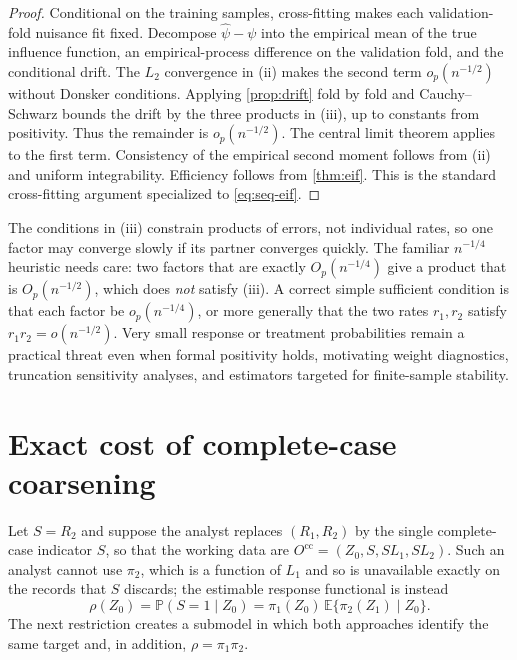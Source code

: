 \documentclass[11pt]{article}
\theoremstyle{definition}
\newcommand{\E}{\mathbb{E}}
\newcommand{\Pp}{\mathbb{P}}
\newcommand{\1}{\mathbf{1}}
\newcommand{\cc}{\mathrm{cc}}
\begin{document}
\begin{proof}
Conditional on the training samples, cross-fitting makes each validation-fold nuisance fit fixed. Decompose $\widehat\psi-\psi$ into the empirical mean of the true influence function, an empirical-process difference on the validation fold, and the conditional drift. The $L_2$ convergence in (ii) makes the second term $o_p(n^{-1/2})$ without Donsker conditions. Applying \cref{prop:drift} fold by fold and Cauchy--Schwarz bounds the drift by the three products in (iii), up to constants from positivity. Thus the remainder is $o_p(n^{-1/2})$. The central limit theorem applies to the first term. Consistency of the empirical second moment follows from (ii) and uniform integrability. Efficiency follows from \cref{thm:eif}. This is the standard cross-fitting argument \citep{chernozhukov2018} specialized to \cref{eq:seq-eif}.
\end{proof}

The conditions in (iii) constrain products of errors, not individual rates, so
one factor may converge slowly if its partner converges quickly. The familiar
$n^{-1/4}$ heuristic needs care: two factors that are exactly $O_p(n^{-1/4})$
give a product that is $O_p(n^{-1/2})$, which does \emph{not} satisfy (iii). A
correct simple sufficient condition is that each factor be $o_p(n^{-1/4})$, or
more generally that the two rates $r_1,r_2$ satisfy $r_1r_2=o(n^{-1/2})$. Very
small response or treatment probabilities remain a practical threat even when
formal positivity holds, motivating weight diagnostics, truncation sensitivity
analyses, and estimators targeted for finite-sample stability.

\section{Exact cost of complete-case coarsening}

Let $S=R_2$ and suppose the analyst replaces $(R_1,R_2)$ by the single
complete-case indicator $S$, so that the working data are
$O^{\cc}=(Z_0,S,SL_1,SL_2)$. Such an analyst cannot use $\pi_2$, which is a
function of $L_1$ and so is unavailable exactly on the records that $S$
discards; the estimable response functional is instead
\begin{equation}\label{eq:rho}
\rho(Z_0)=\Pp(S=1\mid Z_0)=\pi_1(Z_0)\,\E\{\pi_2(Z_1)\mid Z_0\}.
\end{equation}
The next restriction creates a submodel in which both approaches identify the
same target and, in addition, $\rho=\pi_1\pi_2$.
\end{document}
